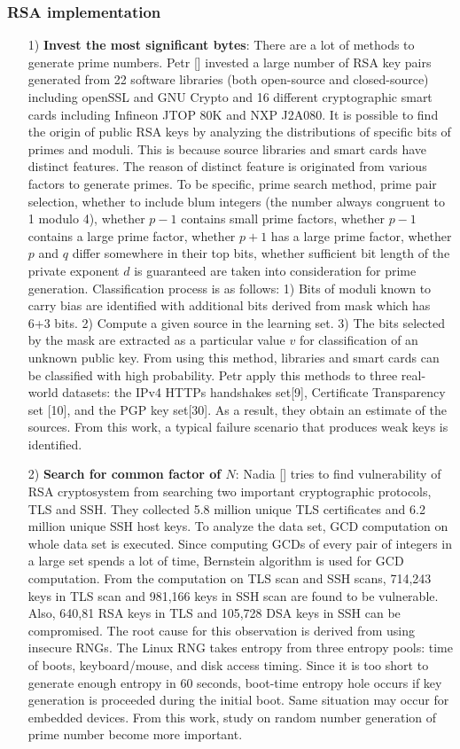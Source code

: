\documentclass[a4paper]{article}
\begin{document}
\subsubsection{RSA implementation}
\begin{enumerate}[label=]
       \item[1)] \textbf{Invest the most significant bytes}: There are a lot of methods to generate prime numbers. Petr [] invested a large number of RSA key pairs generated from 22 software libraries (both open-source and closed-source) including openSSL and GNU Crypto and 16 different cryptographic smart cards including Infineon JTOP 80K and NXP J2A080. It is possible to find the origin of public RSA keys by analyzing the distributions of specific bits of primes and moduli. This is because source libraries and smart cards have distinct features. The reason of distinct feature is originated from various factors to generate primes. To be specific, prime search method, prime pair selection, whether to include blum integers (the number always congruent to 1 modulo 4), whether $p-1$ contains small prime factors, whether $p-1$ contains a large prime factor, whether $p+1$ has a large prime factor, whether $p$ and $q$ differ somewhere in their top bits, whether sufficient bit length of the private exponent $d$ is guaranteed are taken into consideration for prime generation. Classification process is as follows: 1) Bits of moduli known to carry bias are identified with additional bits derived from mask which has 6+3 bits. 2) Compute a given source in the learning set. 3) The bits selected by the mask are extracted as a particular value $v$ for classification of an unknown public key. From using this method, libraries and smart cards can be classified with high probability. Petr apply this methods to three real-world datasets: the IPv4 HTTPs handshakes set[9], Certificate Transparency set [10], and the PGP key set[30]. As a result, they obtain an estimate of the sources. From this work, a typical failure scenario that produces weak keys is identified. 
       
       \item[2)] \textbf{Search for common factor of $N$}: Nadia [] tries to find vulnerability of RSA cryptosystem from searching two important cryptographic protocols, TLS and SSH. They collected 5.8 million unique TLS certificates and 6.2 million unique SSH host keys. To analyze the data set, GCD computation on whole data set is executed. Since computing GCDs of every pair of integers in a large set spends a lot of time, Bernstein algorithm is used for GCD computation. From the computation on TLS scan and SSH scans, 714,243 keys in TLS scan and 981,166 keys in SSH scan are found to be vulnerable. Also, 640,81 RSA keys in TLS and 105,728 DSA keys in SSH can be compromised. The root cause for this observation is derived from using insecure RNGs. The Linux RNG takes entropy from three entropy pools: time of boots, keyboard/mouse, and disk access timing. Since it is too short to generate enough entropy in 60 seconds, boot-time entropy hole occurs if key generation is proceeded during the initial boot. Same situation may occur for embedded devices. From this work, study on random number generation of prime number become more important.
       

\end{enumerate}
\end{document}
